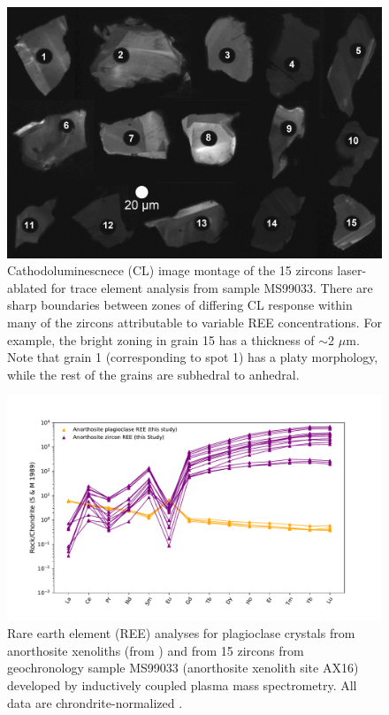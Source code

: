 \documentclass[draft]{agujournal2019}
\begin{document}
\begin{figure}[h!]
\noindent\includegraphics[width=\textwidth]{CL_montage.png}
\centering
\caption{\footnotesize{Cathodoluminescnece (CL) image montage of the 15 zircons laser-ablated for trace element analysis from sample MS99033. There are sharp boundaries between zones of differing CL response within many of the zircons attributable to variable REE concentrations. For example, the bright zoning in grain 15 has a thickness of $\sim$2 $\mu$m. Note that grain 1 (corresponding to spot 1) has a platy morphology, while the rest of the grains are subhedral to anhedral. }}
\label{fig:CL_image}
\end{figure}

\begin{figure}[h!]
\noindent\includegraphics[width=\textwidth]{REE.pdf}
\centering
\caption{\footnotesize{Rare earth element (REE) analyses for plagioclase crystals from anorthosite xenoliths (from ) and from 15 zircons from geochronology sample MS99033 (anorthosite xenolith site AX16) developed by inductively coupled plasma mass spectrometry. All data are chrondrite-normalized \cite{Sun1989a}.}}
\label{fig:REE}
\end{figure}
\end{document}
